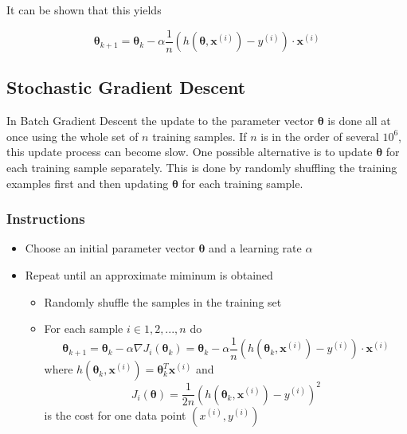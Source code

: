 \documentclass[11pt]{article}
\begin{document}
It can be shown that this yields

\begin{equation}
    \bm{\theta}_{k+1} = \bm{\theta}_{k} -\alpha\frac{1}{n}(h(\bm{\theta},\bm{x}^{(i)})-y^{(i)})\cdot\bm{x}^{(i)}
\end{equation}

\subsection{Stochastic Gradient Descent}
In Batch Gradient Descent the update to the parameter vector $\bm{\theta}$ is done all at once using the whole set of $n$ training samples. If $n$ is in the order of several $10^6$, this update process can become slow. One possible alternative is to update $\bm{\theta}$ for each training sample separately. This is done by randomly shuffling the training examples first and then updating $\bm{\theta}$ for each training sample.

\subsubsection{Instructions}
\begin{itemize}
    \item Choose an initial parameter vector $\bm{\theta}$ and a learning rate $\alpha$
    \item Repeat until an approximate miminum is obtained
          \begin{itemize}
              \item Randomly shuffle the samples in the training set
              \item For each sample $i \in {1,2,...,n}$ do
                    \begin{equation*}
                        \bm{\theta}_{k+1} = \bm{\theta}_{k} -\alpha\nabla J_i(\bm{\theta}_k) = \bm{\theta}_{k} -\alpha\frac{1}{n}(h(\bm{\theta}_k,\bm{x}^{(i)})-y^{(i)})\cdot\bm{x}^{(i)}
                    \end{equation*}
                    where $h(\bm{\theta}_k,\bm{x}^{(i)})=\bm{\theta}_k^T \bm{x}^{(i)}$ and
                    \begin{equation*}
                        J_i(\bm{\theta}) = \frac{1}{2n}(h(\bm{\theta}_k,\bm{x}^{(i)})-y^{(i)})^2
                    \end{equation*}
                    is the cost for one data point $(x^{(i)},y^{(i)})$
          \end{itemize}
\end{itemize}
\end{document}
